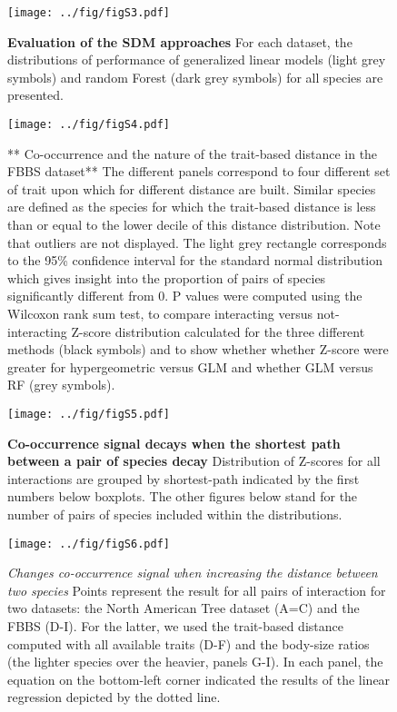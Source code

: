 \newpage

\begin{figure}[htbp]
\centering
\texttt{[image: ../fig/figS3.pdf]}
\caption{\textbf{Evaluation of the SDM approaches} For each dataset, the
distributions of performance of generalized linear models (light grey
symbols) and random Forest (dark grey symbols) for all species are
presented.\label{fig:auc}}
\end{figure}

\newpage

\begin{figure}[htbp]
\centering
\texttt{[image: ../fig/figS4.pdf]}
\caption{** Co-occurrence and the nature of the trait-based distance in
the FBBS dataset** The different panels correspond to four different set
of trait upon which for different distance are built. Similar species
are defined as the species for which the trait-based distance is less
than or equal to the lower decile of this distance distribution. Note
that outliers are not displayed. The light grey rectangle corresponds to
the 95\% confidence interval for the standard normal distribution which
gives insight into the proportion of pairs of species significantly
different from 0. P values were computed using the Wilcoxon rank sum
test, to compare interacting versus not-interacting Z-score distribution
calculated for the three different methods (black symbols) and to show
whether whether Z-score were greater for hypergeometric versus GLM and
whether GLM versus RF (grey symbols).}\label{figdist}
\end{figure}

\newpage

\begin{figure}[htbp]
\centering
\texttt{[image: ../fig/figS5.pdf]}
\caption{\textbf{Co-occurrence signal decays when the shortest path
between a pair of species decay} Distribution of Z-scores for all
interactions are grouped by shortest-path indicated by the first numbers
below boxplots. The other figures below stand for the number of pairs of
species included within the distributions.\label{fig:sht_pth2}}
\end{figure}

\newpage

\begin{figure}[htbp]
\centering
\texttt{[image: ../fig/figS6.pdf]}
\caption{\emph{Changes co-occurrence signal when increasing the distance
between two species} Points represent the result for all pairs of
interaction for two datasets: the North American Tree dataset (A=C) and
the FBBS (D-I). For the latter, we used the trait-based distance
computed with all available traits (D-F) and the body-size ratios (the
lighter species over the heavier, panels G-I). In each panel, the
equation on the bottom-left corner indicated the results of the linear
regression depicted by the dotted line.\label{fig:distrev}}
\end{figure}

